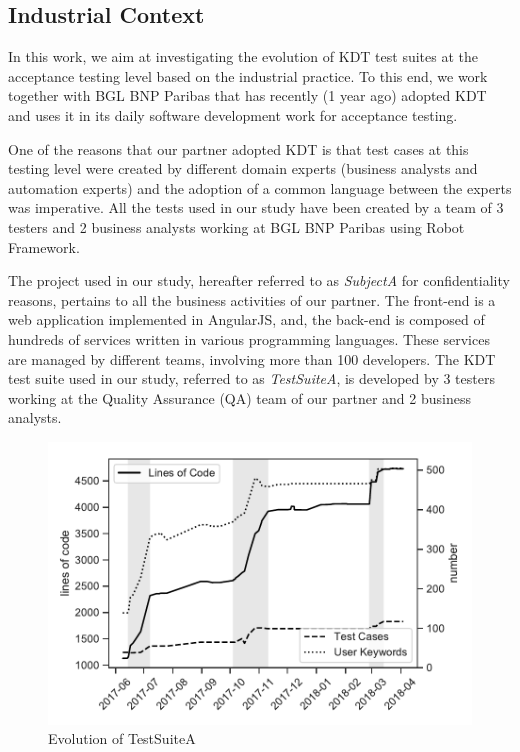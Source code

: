 \subsection{Industrial Context}
\label{sec:evolution-introduction-data}

In this work, we aim at investigating the evolution of KDT test suites at the acceptance testing level based on the industrial practice. To this end, we work together with BGL BNP Paribas that has recently (1 year ago) adopted KDT and uses it in its daily software development work for acceptance testing.

One of the reasons that our partner adopted KDT is that test cases at this testing level were created by different domain experts (business analysts and automation experts) and the adoption of a common language between the experts was imperative. All the tests used in our study have been created by a team of 3 testers and 2 business analysts working at BGL BNP Paribas using Robot Framework.

The project used in our study, hereafter referred to as \emph{SubjectA} for confidentiality reasons, pertains to all the business activities of our partner. The front-end is a web application implemented in AngularJS, and, the back-end is composed of hundreds of services written in various programming languages. These services are managed by different teams, involving more than 100 developers. The KDT test suite used in our study, referred to as \emph{TestSuiteA}, is developed by 3 testers working at the Quality Assurance (QA) team of our partner and 2 business analysts.

\begin{figure}[t!]
  \centering
  \includegraphics[width=0.7\columnwidth]{figures/evolution/project_evolution.pdf}
  \caption{Evolution of TestSuiteA}
  \label{fig:project_evolution}%
\end{figure}

